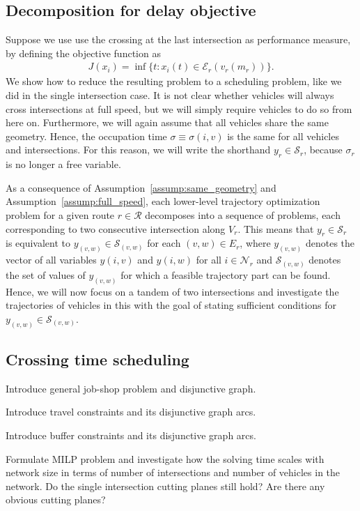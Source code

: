 \documentclass[a4paper]{article}
\theoremstyle{definition}
\theoremstyle{plain}
\begin{document}
\subsection{Decomposition for delay objective}

Suppose we use use the crossing at the last intersection as performance measure, by defining the
objective function as
\begin{align*}
  J(x_{i}) = \inf \{ t: x_{i}(t) \in \mathcal{E}_{r}(v_{r}(m_{r}))\} .
\end{align*}
%
We show how to reduce the resulting problem to a scheduling problem, like we did
in the single intersection case.
%
It is not clear whether vehicles will always cross intersections at full speed,
but we will simply require vehicles to do so from here on.
Furthermore, we will again assume that all vehicles share the same geometry.
Hence, the
occupation time $\sigma \equiv \sigma(i,v)$ is the same for all vehicles and
intersections. For this reason, we will write the shorthand $y_{r} \in \mathcal{S}_{r}$,
because $\sigma_{r}$ is no longer a free variable.

%
As a consequence of Assumption~\ref{assump:same_geometry} and Assumption~\ref{assump:full_speed},
each lower-level trajectory optimization problem for a given route
$r \in \mathcal{R}$ decomposes into a sequence of problems, each corresponding to
two consecutive intersection along $V_{r}$.
%
This means that $y_{r} \in \mathcal{S}_{r}$ is equivalent to
$y_{(v,w)} \in \mathcal{S}_{(v,w)}$ for each $(v,w) \in E_{r}$, where
$y_{(v,w)}$ denotes the vector of all variables $y(i, v)$ and $y(i, w)$ for all
$i \in \mathcal{N}_{r}$ and $\mathcal{S}_{(v,w)}$ denotes the set of values of $y_{(v,w)}$ for which a feasible trajectory part can be found.
%
Hence, we will now focus on a tandem of two intersections and investigate the
trajectories of vehicles in this with the goal of stating sufficient conditions
for $y_{(v,w)} \in \mathcal{S}_{(v,w)}$.

\subsection{Crossing time scheduling}

\begin{itemize}
  \renewcommand\labelitemi{--}
{\color{gray}
\item Introduce general job-shop problem and disjunctive graph.
\item Introduce travel constraints and its disjunctive graph arcs.
\item Introduce buffer constraints and its disjunctive graph arcs.

\item Formulate MILP problem and investigate how the solving time scales with network
size in terms of number of intersections and number of vehicles in the network.
Do the single intersection cutting planes still hold? Are there any obvious
cutting planes?
}
\end{itemize}
\end{document}
